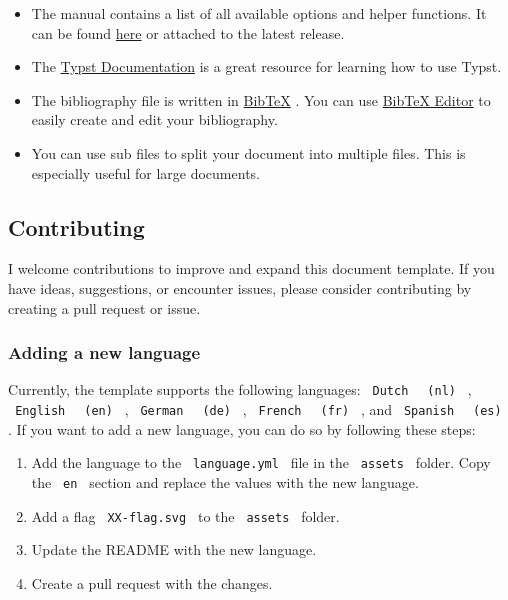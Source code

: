 \begin{itemize}
\tightlist
\item
  The manual contains a list of all available options and helper
  functions. It can be found
  \href{https://github.com/TomVer99/FHICT-typst-template/blob/main/documentation/manual.pdf}{here}
  or attached to the latest release.
\item
  The \href{https://typst.app/docs/}{Typst Documentation} is a great
  resource for learning how to use Typst.
\item
  The bibliography file is written in
  \href{http://www.bibtex.org/Format/}{BibTeX} . You can use
  \href{https://truben.no/latex/bibtex/}{BibTeX Editor} to easily create
  and edit your bibliography.
\item
  You can use sub files to split your document into multiple files. This
  is especially useful for large documents.
\end{itemize}

\subsection{Contributing}\label{contributing}

I welcome contributions to improve and expand this document template. If
you have ideas, suggestions, or encounter issues, please consider
contributing by creating a pull request or issue.

\subsubsection{Adding a new language}\label{adding-a-new-language}

Currently, the template supports the following languages:
\texttt{\ Dutch\ } \texttt{\ (nl)\ } , \texttt{\ English\ }
\texttt{\ (en)\ } , \texttt{\ German\ } \texttt{\ (de)\ } ,
\texttt{\ French\ } \texttt{\ (fr)\ } , and \texttt{\ Spanish\ }
\texttt{\ (es)\ } . If you want to add a new language, you can do so by
following these steps:

\begin{enumerate}
\tightlist
\item
  Add the language to the \texttt{\ language.yml\ } file in the
  \texttt{\ assets\ } folder. Copy the \texttt{\ en\ } section and
  replace the values with the new language.
\item
  Add a flag \texttt{\ XX-flag.svg\ } to the \texttt{\ assets\ } folder.
\item
  Update the README with the new language.
\item
  Create a pull request with the changes.
\end{enumerate}

